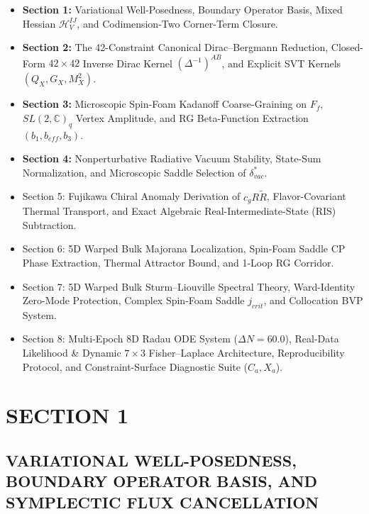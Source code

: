 \documentclass[aps,prd,onecolumn,superscriptaddress,nofootinbib,longbibliography,10pt]{revtex4-2}
\begin{document}
{{  
\begin{itemize}
    
\item \textbf{Section 1:} Variational Well-Posedness, Boundary Operator Basis, Mixed Hessian \(\mathcal{H}_V^{IJ}\), and Codimension-Two Corner-Term Closure.
    
\item \textbf{Section 2:} The 42-Constraint Canonical Dirac–Bergmann Reduction, Closed-Form \(42\times 42\) Inverse Dirac Kernel \((\Delta^{-1})^{AB}\), and Explicit SVT Kernels \((Q_X, G_X, M_X^2)\).
    
\item \textbf{Section 3:} Microscopic Spin-Foam Kadanoff Coarse-Graining on \(F_f\), \(SL(2,\mathbb{C})_q\) Vertex Amplitude, and RG Beta-Function Extraction \((b_1, b_{eff}, b_3)\).
    
\item \textbf{Section 4:} Nonperturbative Radiative Vacuum Stability, State-Sum Normalization, and Microscopic Saddle Selection of \(\delta_{vac}^*\).
    
\item Section 5: Fujikawa Chiral Anomaly Derivation of \(c_g R\tilde{R}\), Flavor-Covariant Thermal Transport, and Exact Algebraic Real-Intermediate-State (RIS) Subtraction.

\item Section 6: 5D Warped Bulk Majorana Localization, Spin-Foam Saddle CP Phase Extraction, Thermal Attractor Bound, and 1-Loop RG Corridor.

\item Section 7: 5D Warped Bulk Sturm--Liouville Spectral Theory, Ward-Identity Zero-Mode Protection, Complex Spin-Foam Saddle \(j_{crit}\), and Collocation BVP System.

\item Section 8: Multi-Epoch 8D Radau ODE System (\(\Delta N = 60.0\)), Real-Data Likelihood \& Dynamic \(7\times 3\) Fisher–Laplace Architecture, Reproducibility Protocol, and Constraint-Surface Diagnostic Suite (\(C_a, X_a\)).
  
\end{itemize}



 

  
\section*{SECTION 1}

  
\subsection*{VARIATIONAL WELL-POSEDNESS, BOUNDARY OPERATOR BASIS, AND SYMPLECTIC FLUX CANCELLATION}

}}
\end{document}
